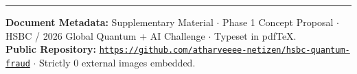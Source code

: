 \documentclass[10pt,a4paper]{article}
\begin{document}
\vspace{3pt}
\noindent\rule{\linewidth}{0.4pt}
\vspace{1.5pt}
{\footnotesize\color{darkslate}
\textbf{Document Metadata:} Supplementary Material $\cdot$ Phase 1 Concept Proposal $\cdot$ HSBC / 2026 Global Quantum + AI Challenge $\cdot$ Typeset in pdf\TeX.\\
\textbf{Public Repository:} \href{https://github.com/atharveeee-netizen/hsbc-quantum-fraud}{\texttt{https://github.com/atharveeee-netizen/hsbc-quantum-fraud}} $\cdot$ Strictly 0 external images embedded.
}
\end{document}
